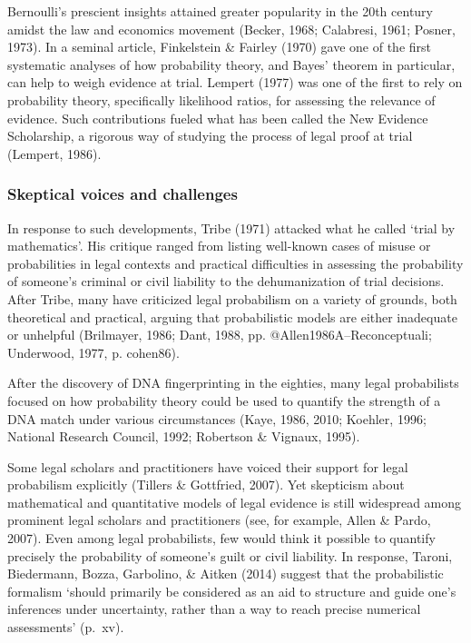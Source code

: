 \documentclass[11pt,dvipsnames,enabledeprecatedfontcommands]{scrartcl}
\begin{document}
Bernoulli's prescient insights attained greater popularity in the 20th
century amidst the law and economics movement (Becker, 1968; Calabresi,
1961; Posner, 1973). In a seminal article, Finkelstein \& Fairley (1970)
gave one of the first systematic analyses of how probability theory, and
Bayes' theorem in particular, can help to weigh evidence at trial.
Lempert (1977) was one of the first to rely on probability theory,
specifically likelihood ratios, for assessing the relevance of evidence.
Such contributions fueled what has been called the New Evidence
Scholarship, a rigorous way of studying the process of legal proof at
trial (Lempert, 1986).

\hypertarget{skeptical-voices-and-challenges}{%
\subsubsection{Skeptical voices and
challenges}\label{skeptical-voices-and-challenges}}

In response to such developments, Tribe (1971) attacked what he called
`trial by mathematics'. His critique ranged from listing well-known
cases of misuse or probabilities in legal contexts and practical
difficulties in assessing the probability of someone's criminal or civil
liability to the dehumanization of trial decisions. After Tribe, many
have criticized legal probabilism on a variety of grounds, both
theoretical and practical, arguing that probabilistic models are either
inadequate or unhelpful (Brilmayer, 1986; Dant, 1988, pp.
@Allen1986A--Reconceptuali; Underwood, 1977, p. cohen86).

After the discovery of DNA fingerprinting in the eighties, many legal
probabilists focused on how probability theory could be used to quantify
the strength of a DNA match under various circumstances (Kaye, 1986,
2010; Koehler, 1996; National Research Council, 1992; Robertson \&
Vignaux, 1995).

Some legal scholars and practitioners have voiced their support for
legal probabilism explicitly (Tillers \& Gottfried, 2007). Yet
skepticism about mathematical and quantitative models of legal evidence
is still widespread among prominent legal scholars and practitioners
(see, for example, Allen \& Pardo, 2007). Even among legal probabilists,
few would think it possible to quantify precisely the probability of
someone's guilt or civil liability. In response, Taroni, Biedermann,
Bozza, Garbolino, \& Aitken (2014) suggest that the probabilistic
formalism `should primarily be considered as an aid to structure and
guide one's inferences under uncertainty, rather than a way to reach
precise numerical assessments' (p.~xv).
\end{document}
